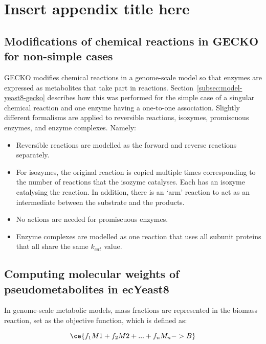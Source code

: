 \chapter{Insert appendix title here}
\label{append:model}

\section{Modifications of chemical reactions in GECKO for non-simple cases}
\label{append:model-gecko}

GECKO modifies chemical reactions in a genome-scale model so that enzymes are expressed as metabolites that take part in reactions.
Section~\ref{subsec:model-yeast8-gecko} describes how this was performed for the simple case of a singular chemical reaction and one enzyme having a one-to-one association.
Slightly different formalisms are applied to reversible reactions, isozymes, promiscuous enzymes, and enzyme complexes.
Namely:
\begin{itemize}
  \item Reversible reactions are modelled as the forward and reverse reactions separately.
  \item For isozymes, the original reaction is copied multiple times corresponding to the number of reactions that the isozyme catalyses.
        Each has an isozyme catalysing the reaction.
        In addition, there is an `arm' reaction to act as an intermediate between the substrate and the products.
  \item No actions are needed for promiscuous enzymes.
  \item Enzyme complexes are modelled as one reaction that uses all subunit proteins that all share the same $k_{cat}$ value.
\end{itemize}


\section{Computing molecular weights of pseudometabolites in ecYeast8}
\label{append:model-molweights}

In genome-scale metabolic models, mass fractions are represented in the biomass reaction, set as the objective function, which is defined as:

\begin{equation}
  \ce{f_{1}M1 + f_{2}M2 + ... + f_{n}M_{n} -> B}
  \label{eq:model-biomass-reaction}
\end{equation}

